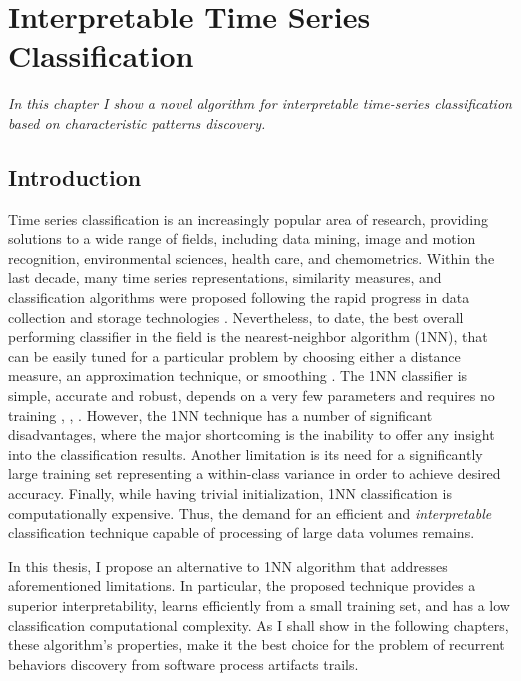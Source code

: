 \chapter{Interpretable Time Series Classification}\label{chapter_sax_vsm}

\textit{In this chapter I show a novel algorithm for interpretable time-series classification based on characteristic 
patterns discovery. }

\section{Introduction}
Time series classification is an increasingly popular area of research, providing solutions to a wide range of fields, 
including data mining, image and motion recognition, environmental sciences, health care, and chemometrics. 
Within the last decade, many time series representations, similarity measures, and classification algorithms were 
proposed following the rapid progress in data collection and storage technologies \cite{citeulike:10358271}. 
Nevertheless, to date, the best overall performing classifier in the field is the nearest-neighbor algorithm (1NN), 
that can be easily tuned for a particular problem by choosing either a distance measure, an approximation technique, 
or smoothing \cite{citeulike:10358271}.
The 1NN classifier is simple, accurate and robust, depends on a very few parameters 
and requires no training \cite{citeulike:10358271}, \cite{citeulike:532340}, \cite{citeulike:12563424}.
However, the 1NN technique has a number of significant disadvantages, where the major shortcoming is the 
inability to offer any insight into the classification results. Another limitation is its need for a significantly large 
training set representing a within-class variance in order to achieve desired accuracy. 
Finally, while having trivial initialization, 1NN classification is computationally expensive. 
Thus, the demand for an efficient and \textit{interpretable} classification technique capable of processing of large 
data volumes remains.

In this thesis, I propose an alternative to 1NN algorithm that addresses aforementioned limitations. 
In particular, the proposed technique provides a superior interpretability, learns efficiently from a small training set,
and has a low classification computational complexity. As I shall show in the following chapters, these algorithm's
properties, make it the best choice for the problem of recurrent behaviors discovery from software process artifacts trails.

